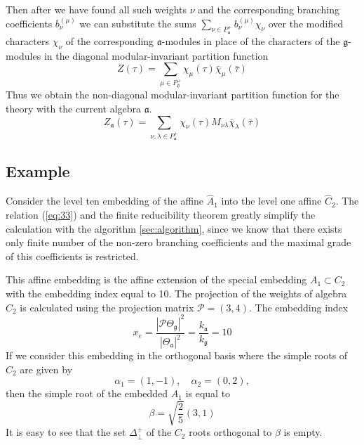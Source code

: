 \documentclass[a4paper,12pt]{article}
\theoremstyle{definition} \newtheorem{Def}{Definition}
\begin{document}
Then after we have found all such weights $\nu$ and the corresponding branching coefficients $b^{(\mu)}_{\nu}$ we can substitute the sums $\sum_{\nu \in P^{+}_{\mathfrak{a}}}b^{(\mu)}_{\nu} \chi_{\nu}$ over the modified characters $\chi_{\nu}$ of the corresponding $\mathfrak{a}$-modules in place of the characters of the $\mathfrak{g}$-modules in the diagonal modular-invariant partition function
\begin{equation}
  \label{eq:34}
   Z(\tau)=\sum_{ \mu\in P^{+}_{\mathfrak{g}}} \chi_{\mu}(\tau)\bar \chi_{\mu}(\bar \tau)
\end{equation}
Thus we obtain the non-diagonal modular-invariant  partition function for the theory with the current algebra $\mathfrak{a}$.
\begin{equation}
  \label{eq:36}
   Z_{\mathfrak{a}}(\tau)=\sum_{ \nu,\lambda\in P^{+}_{\mathfrak{a}}} \chi_{\nu}(\tau)M_{\nu\lambda}\bar \chi_{\lambda}(\bar \tau)
\end{equation}


\subsection{Example}
\label{sec:example}

Consider the level ten embedding of the affine $\hat A_1$ into the level one affine $\hat C_2$. 
The relation (\ref{eq:33}) and the finite reducibility theorem greatly simplify the calculation with the algorithm \ref{sec:algorithm}, since we know that there exists only finite number of the non-zero branching coefficients and the maximal grade of this coefficients is restricted.

This affine embedding is the affine extension of the special embedding $A_1\subset C_2$ with the embedding index equal to 10. The projection of the weights of algebra $C_2$ is calculated using the projection matrix $\mathcal{P}=(3,4)$. The embedding index
\begin{equation}
  \label{eq:37}
  x_e=\frac{\left|\mathcal{P}\Theta_{\mathfrak{g}}\right|^2}{\left|\Theta_{\mathfrak{a}}\right|^2}=\frac{k_{\mathfrak{a}}}{k_{\mathfrak{g}}}=10
\end{equation}
If we consider this embedding in the orthogonal basis where the simple roots of $C_2$ are given by
\begin{equation}
  \label{eq:38}
  \alpha_1=(1,-1),\quad \alpha_2=(0,2),
\end{equation}
then the simple root of the embedded $A_1$ is equal to
\begin{equation}
  \label{eq:39}
  \beta=\sqrt{\frac{2}{5}}(3,1)
\end{equation}
It is easy to see that the set $\Delta^{+}_{\bot}$ of the $C_2$ roots orthogonal to $\beta$ is empty.
\end{document}
